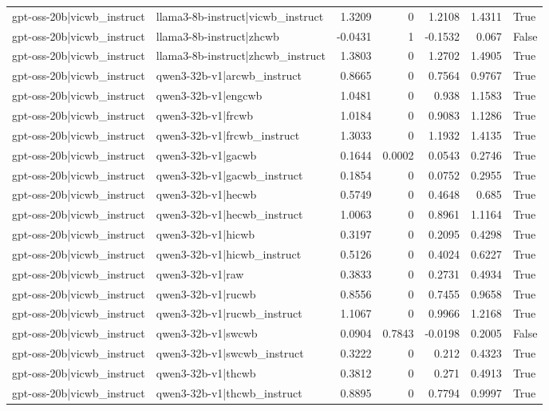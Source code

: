 \begin{table}
\begin{tabular}{l l r r r r l}
gpt-oss-20b|vicwb_instruct & llama3-8b-instruct|vicwb_instruct & 1.3209 & 0 & 1.2108 & 1.4311 & True \\
gpt-oss-20b|vicwb_instruct & llama3-8b-instruct|zhcwb & -0.0431 & 1 & -0.1532 & 0.067 & False \\
gpt-oss-20b|vicwb_instruct & llama3-8b-instruct|zhcwb_instruct & 1.3803 & 0 & 1.2702 & 1.4905 & True \\
gpt-oss-20b|vicwb_instruct & qwen3-32b-v1|arcwb_instruct & 0.8665 & 0 & 0.7564 & 0.9767 & True \\
gpt-oss-20b|vicwb_instruct & qwen3-32b-v1|engcwb & 1.0481 & 0 & 0.938 & 1.1583 & True \\
gpt-oss-20b|vicwb_instruct & qwen3-32b-v1|frcwb & 1.0184 & 0 & 0.9083 & 1.1286 & True \\
gpt-oss-20b|vicwb_instruct & qwen3-32b-v1|frcwb_instruct & 1.3033 & 0 & 1.1932 & 1.4135 & True \\
gpt-oss-20b|vicwb_instruct & qwen3-32b-v1|gacwb & 0.1644 & 0.0002 & 0.0543 & 0.2746 & True \\
gpt-oss-20b|vicwb_instruct & qwen3-32b-v1|gacwb_instruct & 0.1854 & 0 & 0.0752 & 0.2955 & True \\
gpt-oss-20b|vicwb_instruct & qwen3-32b-v1|hecwb & 0.5749 & 0 & 0.4648 & 0.685 & True \\
gpt-oss-20b|vicwb_instruct & qwen3-32b-v1|hecwb_instruct & 1.0063 & 0 & 0.8961 & 1.1164 & True \\
gpt-oss-20b|vicwb_instruct & qwen3-32b-v1|hicwb & 0.3197 & 0 & 0.2095 & 0.4298 & True \\
gpt-oss-20b|vicwb_instruct & qwen3-32b-v1|hicwb_instruct & 0.5126 & 0 & 0.4024 & 0.6227 & True \\
gpt-oss-20b|vicwb_instruct & qwen3-32b-v1|raw & 0.3833 & 0 & 0.2731 & 0.4934 & True \\
gpt-oss-20b|vicwb_instruct & qwen3-32b-v1|rucwb & 0.8556 & 0 & 0.7455 & 0.9658 & True \\
gpt-oss-20b|vicwb_instruct & qwen3-32b-v1|rucwb_instruct & 1.1067 & 0 & 0.9966 & 1.2168 & True \\
gpt-oss-20b|vicwb_instruct & qwen3-32b-v1|swcwb & 0.0904 & 0.7843 & -0.0198 & 0.2005 & False \\
gpt-oss-20b|vicwb_instruct & qwen3-32b-v1|swcwb_instruct & 0.3222 & 0 & 0.212 & 0.4323 & True \\
gpt-oss-20b|vicwb_instruct & qwen3-32b-v1|thcwb & 0.3812 & 0 & 0.271 & 0.4913 & True \\
gpt-oss-20b|vicwb_instruct & qwen3-32b-v1|thcwb_instruct & 0.8895 & 0 & 0.7794 & 0.9997 & True \\

\end{tabular}
\end{table}
